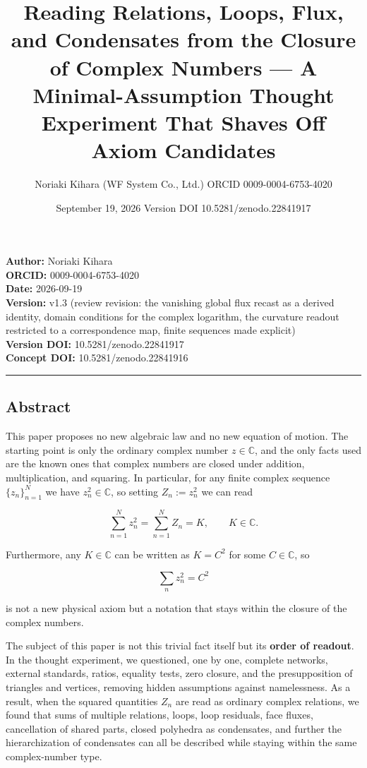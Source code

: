 \documentclass[
  a4paper,
]{article}
\title{Reading Relations, Loops, Flux, and Condensates from the Closure
of Complex Numbers --- A Minimal-Assumption Thought Experiment That
Shaves Off Axiom Candidates}
\author{Noriaki Kihara (WF System Co., Ltd.) ORCID 0009-0004-6753-4020}
\date{September 19, 2026 Version DOI 10.5281/zenodo.22841917}
\begin{document}
\maketitle

\textbf{Author:} Noriaki Kihara\\
\textbf{ORCID:} 0009-0004-6753-4020\\
\textbf{Date:} 2026-09-19\\
\textbf{Version:} v1.3 (review revision: the vanishing global flux
recast as a derived identity, domain conditions for the complex
logarithm, the curvature readout restricted to a correspondence map,
finite sequences made explicit)\\
\textbf{Version DOI:} 10.5281/zenodo.22841917\\
\textbf{Concept DOI:} 10.5281/zenodo.22841916

\begin{center}\rule{0.5\linewidth}{0.5pt}\end{center}

\subsection{Abstract}\label{abstract}

This paper proposes no new algebraic law and no new equation of motion.
The starting point is only the ordinary complex number
\(z\in\mathbb C\), and the only facts used are the known ones that
complex numbers are closed under addition, multiplication, and squaring.
In particular, for any finite complex sequence \(\{z_n\}_{n=1}^{N}\) we
have \(z_n^2\in\mathbb C\), so setting \(Z_n:=z_n^2\) we can read

\[
\sum_{n=1}^{N} z_n^2=\sum_{n=1}^{N} Z_n=K,\qquad K\in\mathbb C.
\]

Furthermore, any \(K\in\mathbb C\) can be written as \(K=C^2\) for some
\(C\in\mathbb C\), so

\[
\sum_n z_n^2=C^2
\]

is not a new physical axiom but a notation that stays within the closure
of the complex numbers.

The subject of this paper is not this trivial fact itself but its
\textbf{order of readout}. In the thought experiment, we questioned, one
by one, complete networks, external standards, ratios, equality tests,
zero closure, and the presupposition of triangles and vertices, removing
hidden assumptions against namelessness. As a result, when the squared
quantities \(Z_n\) are read as ordinary complex relations, we found that
sums of multiple relations, loops, loop residuals, face fluxes,
cancellation of shared parts, closed polyhedra as condensates, and
further the hierarchization of condensates can all be described while
staying within the same complex-number type.
\end{document}
